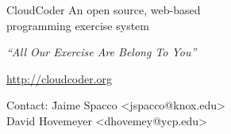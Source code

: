 \documentclass[11pt,a4paper]{memoir}
\begin{document}
\pagecolor{white}
\begin{minipage}[t]{54mm}
{\Huge CloudCoder}
\vskip 2mm
An open source, web-based\\
programming exercise system\\
\end{minipage}\hskip 2mm\begin{minipage}[t]{25mm}
\end{minipage}

{\small
\vskip -1mm
\centerline{\em ``All Our Exercise Are Belong To You''}
\vskip 2mm
\centerline{\url{http://cloudcoder.org}}
\vskip 3mm\scriptsize
\begin{minipage}{75mm}
\begin{tabbing}
Contact: \= Jaime Spacco \textless jspacco@knox.edu\textgreater \\
         \> David Hovemeyer \textless dhovemey@ycp.edu\textgreater
\end{tabbing}
\end{minipage}
}
\end{document}
